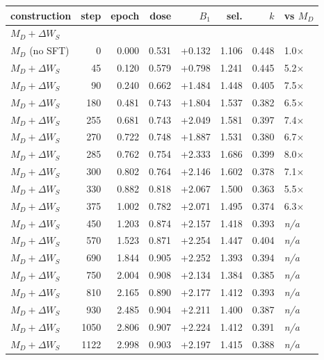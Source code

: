\begin{table}[!ht]
\centering
\footnotesize
\setlength{\tabcolsep}{4pt}
\begin{tabular}{lrrrrrrl}
\toprule
construction & step & epoch & dose & $B_1$ & sel. & $k$ & vs $M_D$ \\
\midrule
\multicolumn{8}{l}{\emph{$M_D{+}\Delta W_S$}} \\
$M_D$ (no SFT) & 0 & 0.000 & 0.531 & +0.132 & 1.106 & 0.448 & 1.0$\times$ \\
$M_D{+}\Delta W_S$ & 45 & 0.120 & 0.579 & +0.798 & 1.241 & 0.445 & 5.2$\times$ \\
$M_D{+}\Delta W_S$ & 90 & 0.240 & 0.662 & +1.484 & 1.448 & 0.405 & 7.5$\times$ \\
$M_D{+}\Delta W_S$ & 180 & 0.481 & 0.743 & +1.804 & 1.537 & 0.382 & 6.5$\times$ \\
$M_D{+}\Delta W_S$ & 255 & 0.681 & 0.743 & +2.049 & 1.581 & 0.397 & 7.4$\times$ \\
$M_D{+}\Delta W_S$ & 270 & 0.722 & 0.748 & +1.887 & 1.531 & 0.380 & 6.7$\times$ \\
$M_D{+}\Delta W_S$ & 285 & 0.762 & 0.754 & +2.333 & 1.686 & 0.399 & 8.0$\times$ \\
$M_D{+}\Delta W_S$ & 300 & 0.802 & 0.764 & +2.146 & 1.602 & 0.378 & 7.1$\times$ \\
$M_D{+}\Delta W_S$ & 330 & 0.882 & 0.818 & +2.067 & 1.500 & 0.363 & 5.5$\times$ \\
$M_D{+}\Delta W_S$ & 375 & 1.002 & 0.782 & +2.071 & 1.495 & 0.374 & 6.3$\times$ \\
$M_D{+}\Delta W_S$ & 450 & 1.203 & 0.874 & +2.157 & 1.418 & 0.393 & \textit{n/a} \\
$M_D{+}\Delta W_S$ & 570 & 1.523 & 0.871 & +2.254 & 1.447 & 0.404 & \textit{n/a} \\
$M_D{+}\Delta W_S$ & 690 & 1.844 & 0.905 & +2.252 & 1.393 & 0.394 & \textit{n/a} \\
$M_D{+}\Delta W_S$ & 750 & 2.004 & 0.908 & +2.134 & 1.384 & 0.385 & \textit{n/a} \\
$M_D{+}\Delta W_S$ & 810 & 2.165 & 0.890 & +2.177 & 1.412 & 0.393 & \textit{n/a} \\
$M_D{+}\Delta W_S$ & 930 & 2.485 & 0.904 & +2.211 & 1.400 & 0.387 & \textit{n/a} \\
$M_D{+}\Delta W_S$ & 1050 & 2.806 & 0.907 & +2.224 & 1.412 & 0.391 & \textit{n/a} \\
$M_D{+}\Delta W_S$ & 1122 & 2.998 & 0.903 & +2.197 & 1.415 & 0.388 & \textit{n/a} \\

\end{tabular}
\end{table}

